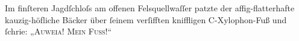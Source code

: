 Im finſteren Jagdſchloſs am offenen Felsquellwaſſer patzte der affig-flatterhafte kauzig-höf‌\/liche Bäcker über ſeinem verſifften kniffligen C-Xylophon-Fuß und ſchrie: „\textsc{Auweia! Mein Fuß!}“